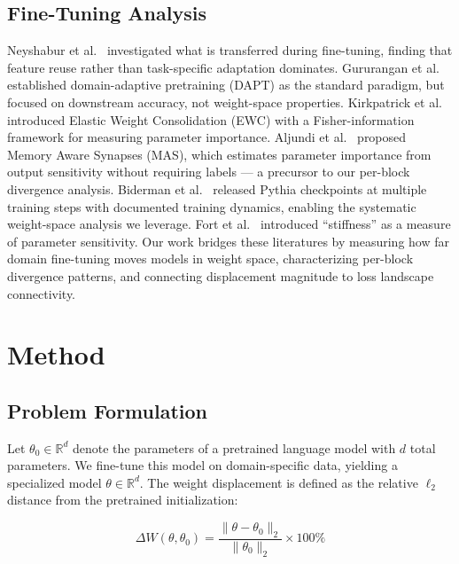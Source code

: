 \documentclass[11pt,a4paper]{article}
\begin{document}
\subsection{Fine-Tuning Analysis}

Neyshabur et al.~\cite{neyshabur2020transfer} investigated what is transferred during fine-tuning, finding that feature reuse rather than task-specific adaptation dominates. Gururangan et al.~\cite{gururangan2020dapt} established domain-adaptive pretraining (DAPT) as the standard paradigm, but focused on downstream accuracy, not weight-space properties. Kirkpatrick et al.~\cite{kirkpatrick2017ewc} introduced Elastic Weight Consolidation (EWC) with a Fisher-information framework for measuring parameter importance. Aljundi et al.~\cite{aljundi2018mas} proposed Memory Aware Synapses (MAS), which estimates parameter importance from output sensitivity without requiring labels — a precursor to our per-block divergence analysis. Biderman et al.~\cite{biderman2023pythia} released Pythia checkpoints at multiple training steps with documented training dynamics, enabling the systematic weight-space analysis we leverage. Fort et al.~\cite{fort2019stiffness} introduced ``stiffness'' as a measure of parameter sensitivity. Our work bridges these literatures by measuring how far domain fine-tuning moves models in weight space, characterizing per-block divergence patterns, and connecting displacement magnitude to loss landscape connectivity.

\section{Method}

\subsection{Problem Formulation}

Let $\theta_0 \in \mathbb{R}^d$ denote the parameters of a pretrained language model with $d$ total parameters. We fine-tune this model on domain-specific data, yielding a specialized model $\theta \in \mathbb{R}^d$. The weight displacement is defined as the relative $\ell_2$ distance from the pretrained initialization:

\begin{equation}\label{eq:dw}
\Delta W(\theta, \theta_0) = \frac{\|\theta - \theta_0\|_2}{\|\theta_0\|_2} \times 100\%
\end{equation}
\end{document}
